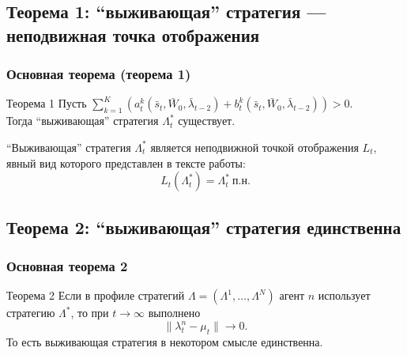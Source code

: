 \documentclass[10pt]{beamer}
\theoremstyle{definition}
\theoremstyle{remark}
\begin{document}
\subsection{Теорема 1: ``выживающая'' стратегия — неподвижная точка отображения}
    \begin{frame}\frametitle{Основная теорема (теорема 1)}
    \begin{block}{Теорема 1}
    \label{theorem1-main}
    Пусть $\sum_{k=1}^K (a_{t}^k(\bar s_{t}, \bar W_0, \bar\lambda_{t-2}) + b_{t}^k (\bar s_{t}, \bar W_0, \bar\lambda_{t-2})) > 0.$\\
    Тогда ``выживающая'' стратегия $\Lambda_t^*$ существует.
    \end{block}
    
    ``Выживающая'' стратегия $\Lambda_t^*$ является неподвижной точкой отображения $L_t$, явный вид которого представлен в тексте работы:
    \begin{equation}
    \label{3-lambda-star-fixed-point}
    L_{t}(\Lambda_{t}^*) = \Lambda^*_{t}\ \text{п.н.}
    \end{equation}
    
    
    
\end{frame}



\subsection{Теорема 2: ``выживающая'' стратегия единственна}
\begin{frame}\frametitle{Основная теорема 2}
	\begin{block}{Теорема 2}
    \label{theorem2-convergence}
    Если в профиле стратегий $\Lambda=(\Lambda^1,\dots,\Lambda^N)$ агент $n$ использует стратегию $\Lambda^*$, то при $t\to\infty$ выполнено
    \[ 
    \|\lambda_t^n - \mu_t\| \to 0. 
    \]
    То есть выживающая стратегия в некотором смысле единственна.

\end{block}

\end{frame}

\end{document}
